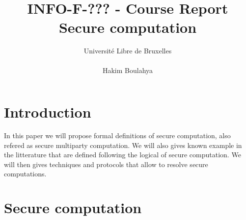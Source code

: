 \documentclass[10pt,a4paper]{article}
\title{INFO-F-??? -     Course Report \\
Secure computation}
\author{Université Libre de Bruxelles \\
\\ Hakim Boulahya}
\begin{document}
\maketitle


\section{Introduction}

In this paper we will propose formal definitions of secure
computation, also refered as secure multiparty computation.
We will also gives known example in the litterature
that are defined following the logical of secure computation.
We will then gives techniques and protocols that allow
to resolve secure computations.

\section{Secure computation}







\end{document}
